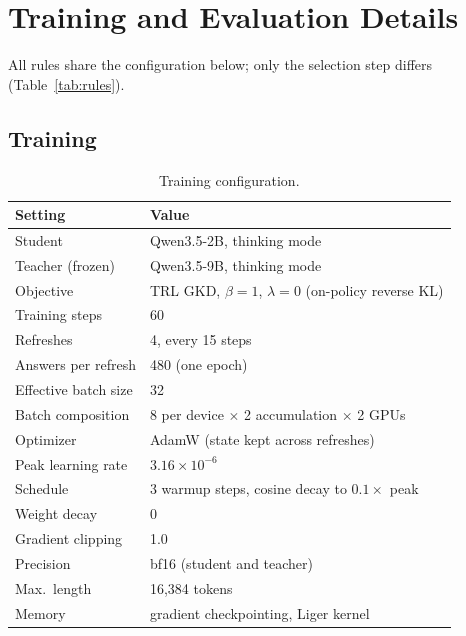 \documentclass[11pt]{article}
\begin{document}
\appendix
\raggedbottom
\setlength{\intextsep}{8pt plus 2pt minus 2pt}

\section{Training and Evaluation Details}
\label{app:config}

All rules share the configuration below; only the selection step differs (Table~\ref{tab:rules}).

\subsection{Training}

\begin{table}[H]
\centering
\small
\begin{tabular}{@{}P{2.6cm}P{4.4cm}@{}}
\toprule
\textbf{Setting} & \textbf{Value} \\
\midrule
Student & Qwen3.5-2B, thinking mode \\
Teacher (frozen) & Qwen3.5-9B, thinking mode \\
Objective & TRL GKD, $\beta = 1$, $\lambda = 0$ (on-policy reverse KL) \\
Training steps & 60 \\
Refreshes & 4, every 15 steps \\
Answers per refresh & 480 (one epoch) \\
Effective batch size & 32 \\
Batch composition & 8 per device $\times$ 2 accumulation $\times$ 2 GPUs \\
Optimizer & AdamW (state kept across refreshes) \\
Peak learning rate & $3.16 \times 10^{-6}$ \\
Schedule & 3 warmup steps, cosine decay to $0.1 \times$ peak \\
Weight decay & 0 \\
Gradient clipping & 1.0 \\
Precision & bf16 (student and teacher) \\
Max.\ length & 16,384 tokens \\
Memory & gradient checkpointing, Liger kernel \\
\bottomrule
\end{tabular}
\caption{Training configuration.}
\label{tab:config}
\end{table}
\end{document}

